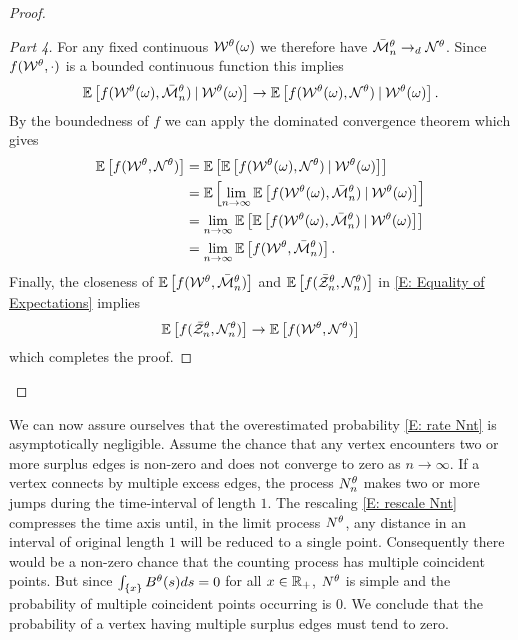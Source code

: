 \begin{proof}
\begin{proof}[Part 4]
For any fixed continuous $\mathcal{W}^{\theta}(\omega)$ we therefore have $\bar{\mathcal{M}}_n^{\theta} \rightarrow_d \mathcal{N}^{\theta}$.
Since $f(\mathcal{W}^{\theta}, \cdot)$ is a bounded continuous function this implies
\begin{equation}
	\mathbb{E} \left[ f(\mathcal{W}^{\theta}(\omega), \bar{\mathcal{M}}_n^{\theta}) \: | \: \mathcal{W}^{\theta}(\omega) \right] \rightarrow \mathbb{E} \left[ f(\mathcal{W}^{\theta}(\omega), \mathcal{N}^{\theta})\: | \: \mathcal{W}^{\theta}(\omega) \right].
\end{equation}
By the boundedness of $f$ we can apply the dominated convergence theorem which gives
\begin{equation}
	\begin{aligned}
	\mathbb{E} \left[ f(\mathcal{W}^{\theta}, \mathcal{N}^{\theta}) \right]
	&= \mathbb{E} \left[  \mathbb{E} \left[ f(\mathcal{W}^{\theta}(\omega), \mathcal{N}^{\theta}) \: | \: \mathcal{W}^{\theta}(\omega) \right]  \right] \\
	&= \mathbb{E} \left[  \lim_{n\rightarrow\infty} \mathbb{E} \left[ f(\mathcal{W}^{\theta}(\omega), \bar{\mathcal{M}}_n^{\theta}) \: | \: \mathcal{W}^{\theta}(\omega) \right]  \right] \\
	&= \lim_{n\rightarrow\infty} \mathbb{E} \left[  \mathbb{E} \left[ f(\mathcal{W}^{\theta}(\omega), \bar{\mathcal{M}}_n^{\theta}) \: | \: \mathcal{W}^{\theta}(\omega) \right]  \right] \\
	&= \lim_{n\rightarrow\infty} \mathbb{E} \left[  f(\mathcal{W}^{\theta}, \bar{\mathcal{M}}_n^{\theta})  \right].
	\end{aligned}
\end{equation}
Finally, the closeness of $\mathbb{E} \left[  f(\mathcal{W}^{\theta}, \bar{\mathcal{M}}_n^{\theta})  \right]$ and $\mathbb{E} \left[ f(\bar{\mathcal{Z}}^{\theta}_n, \mathcal{N}_n^{\theta}) \right]$ in \eqref{E: Equality of Expectations} implies
\begin{equation}
	\mathbb{E} \left[ f(\bar{\mathcal{Z}}^{\theta}_n, \mathcal{N}_n^{\theta}) \right] \rightarrow \mathbb{E} \left[ f(\mathcal{W}^{\theta}, \mathcal{N}^{\theta}) \right]
\end{equation}
which completes the proof.
\end{proof}
\end{proof}

\bigskip

We can now assure ourselves that the overestimated probability \eqref{E: rate Nnt} is asymptotically negligible.
Assume the chance that any vertex encounters two or more surplus edges is non-zero and does not converge to zero as $n \rightarrow \infty$.
If a vertex connects by multiple excess edges, the process $N_n^{\theta}$ makes two or more jumps during the time-interval of length $1$.
The rescaling \eqref{E: rescale Nnt} compresses the time axis until, in the limit process $N^{\theta}$, 
any distance in an interval of original length $1$ will be reduced to a single point.
Consequently there would be a non-zero chance that the counting process has multiple coincident points.
But since $\int_{\{x\}} B^{\theta}(s)ds = 0$ for all $x \in \mathbb{R}_+$, 
$N^{\theta}$ is simple and the probability of multiple coincident points occurring is $0$.
We conclude that the probability of a vertex having multiple surplus edges must tend to zero.



